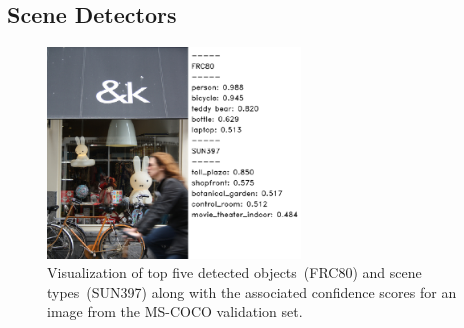 \subsection{Scene Detectors}
\begin{figure}[tbh] 
  \centering
  \includegraphics[width=0.6\textwidth]{./images/95474.pdf} 
  \caption{Visualization of top five detected objects~(FRC80) and scene
  types~(SUN397) along with the associated confidence scores for an image from
  the MS-COCO validation set.}
  \label{fig:COCODetVis} 
\end{figure}





